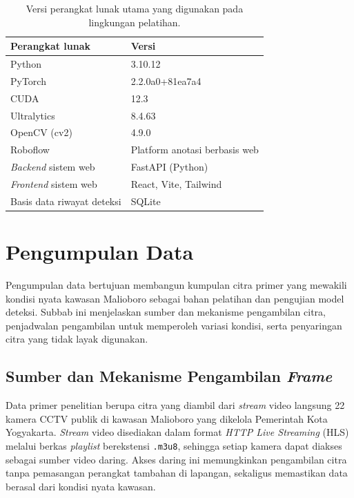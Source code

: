 \begin{table}[h]
    \centering
    \caption{Versi perangkat lunak utama yang digunakan pada lingkungan pelatihan.}
    \label{tab:perangkat_lunak}
    \begin{tabular}{|l|l|}
        \hline
        \textbf{Perangkat lunak} & \textbf{Versi} \\
        \hline \hline
        Python & 3.10.12 \\
        PyTorch & 2.2.0a0+81ea7a4 \\
        CUDA & 12.3 \\
        Ultralytics & 8.4.63 \\
        OpenCV (cv2) & 4.9.0 \\
        Roboflow & Platform anotasi berbasis web \\
        \textit{Backend} sistem web & FastAPI (Python) \\
        \hline
        \textit{Frontend} sistem web & React, Vite, Tailwind \\
        \hline
        Basis data riwayat deteksi & SQLite \\
        \hline
    \end{tabular}
\end{table}

\section{Pengumpulan Data}
\label{sec:pengumpulan_data}

Pengumpulan data bertujuan membangun kumpulan citra primer yang mewakili kondisi nyata 
kawasan Malioboro sebagai bahan pelatihan dan pengujian model deteksi. Subbab ini 
menjelaskan sumber dan mekanisme pengambilan citra, penjadwalan pengambilan untuk 
memperoleh variasi kondisi, serta penyaringan citra yang tidak layak digunakan.

\subsection{Sumber dan Mekanisme Pengambilan \textit{Frame}}

Data primer penelitian berupa citra yang diambil dari \textit{stream} video langsung 22 
kamera CCTV publik di kawasan Malioboro yang dikelola Pemerintah Kota Yogyakarta. 
\textit{Stream} video disediakan dalam format \textit{HTTP Live Streaming} (HLS) melalui 
berkas \textit{playlist} berekstensi \texttt{.m3u8}, sehingga setiap kamera dapat diakses 
sebagai sumber video daring. Akses daring ini memungkinkan pengambilan citra tanpa pemasangan 
perangkat tambahan di lapangan, sekaligus memastikan data berasal dari kondisi nyata 
kawasan.

